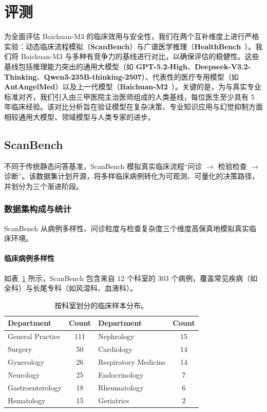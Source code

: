 \section{评测}
为全面评估 Baichuan-M3 的临床效用与安全性，我们在两个互补维度上进行严格实验：动态临床流程模拟（\textbf{ScanBench}）与广谱医学推理（\textbf{HealthBench}~\cite{healthbench}）。我们将 Baichuan-M3 与多种有竞争力的基线进行对比，以确保评估的稳健性。这些基线包括推理能力突出的通用大模型（如 \textbf{GPT-5.2-High}\cite{openai2025gpt52}、\textbf{Deepseek-V3.2-Thinking}\cite{deepseek2025v32thinking}、\textbf{Qwen3-235B-thinking-2507}\cite{qwen3-235b-thinking-2507}）、代表性的医疗专用模型（如 \textbf{AntAngelMed}\cite{antangelmed2026}）以及上一代模型（\textbf{Baichuan-M2}~\cite{baichuan-m2}）。关键的是，为与真实专业标准对齐，我们引入由三甲医院主治医师组成的人类基线，每位医生至少具有 5 年临床经验。该对比分析旨在验证模型在复杂决策、专业知识应用与幻觉抑制方面相较通用大模型、领域模型与人类专家的进步。

\subsection{ScanBench}
不同于传统静态问答基准，ScanBench 模拟真实临床流程“问诊 $\rightarrow$ 检验检查 $\rightarrow$ 诊断”。该数据集计划开源，将多样临床病例转化为可观测、可量化的决策路径，并划分为三个渐进阶段。

\subsubsection{数据集构成与统计}
ScanBench 从病例多样性、问诊粒度与检查复杂度三个维度高保真地模拟真实临床环境。

\paragraph{临床病例多样性}
如表~\ref{tab:scanbench_distribution} 所示，ScanBench 包含来自 12 个科室的 303 个病例，覆盖常见疾病（如全科）与长尾专科（如风湿科、血液科）。

\begin{table}[H]
\centering
\caption{按科室划分的临床样本分布。}
\label{tab:scanbench_distribution}
\begin{tabular}{lclc} %
\toprule
\textbf{Department} & \textbf{Count} & \textbf{Department} & \textbf{Count} \\ \midrule
General Practice    & 111 & Nephrology           & 15 \\
Surgery             & 50  & Cardiology           & 14 \\
Gynecology          & 26  & Respiratory Medicine & 14 \\
Neurology           & 25  & Endocrinology        & 7  \\
Gastroenterology    & 18  & Rheumatology         & 6  \\
Hematology          & 15  & Geriatrics           & 2  \\ \bottomrule
\end{tabular}
\end{table}

